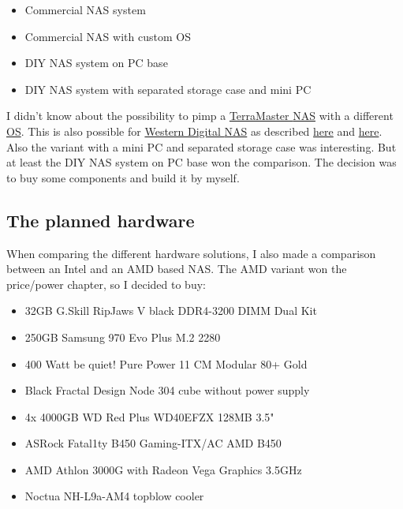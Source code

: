 \begin{itemize}
    \item Commercial \gls{NAS} system
    \item Commercial \gls{NAS} with custom OS
    \item DIY \gls{NAS} system on PC base
    \item DIY \gls{NAS} system with separated storage case and mini PC
\end{itemize}

I didn't know about the possibility to pimp a \href{https://www.terra-master.com}{TerraMaster \gls{NAS}}
with a different \href{https://www.youtube.com/watch?v=f9Fh8XgREJ0}{OS}. This
is also possible for \href{https://www.westerndigital.com}{Western Digital \gls{NAS}}
as described \href{https://community.wd.com/t/firmware-freenas-on-pr4100-updated/218730/11}{here}
and \href{https://forum.openmediavault.org/index.php?thread/37009-can-i-install-omv-on-a-wd-nas/}{here}.
Also the variant with a mini PC and separated storage case was interesting. But
at least the DIY \gls{NAS} system on PC base won the comparison. The decision
was to buy some components and build it by myself.

\subsection{The planned hardware}

When comparing the different hardware solutions, I also made a comparison
between an Intel and an AMD based \gls{NAS}. The AMD variant won the price/power
chapter, so I decided to buy:

\begin{itemize}
    \item 32GB G.Skill RipJaws V black DDR4-3200 DIMM Dual Kit
    \item 250GB Samsung 970 Evo Plus M.2 2280
    \item 400 Watt be quiet! Pure Power 11 CM Modular 80+ Gold
    \item Black Fractal Design Node 304 cube without power supply
    \item 4x 4000GB WD Red Plus WD40EFZX 128MB 3.5"
    \item ASRock Fatal1ty B450 Gaming-ITX/AC AMD B450
    \item AMD Athlon 3000G with Radeon Vega Graphics 3.5GHz
    \item Noctua NH-L9a-AM4 topblow cooler
\end{itemize}

